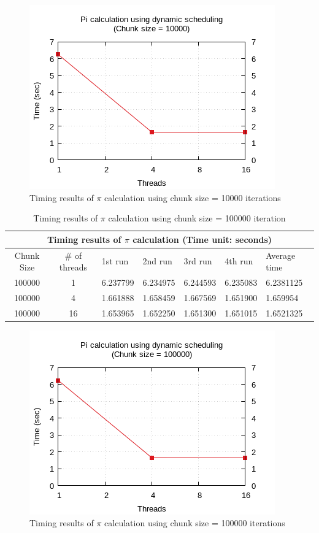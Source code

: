 \documentclass{article}
\begin{document}
\begin{figure}[htbp]
  \centering
  \includegraphics[width=0.55\columnwidth]{../ex1/plots/pi_c10000.png}
  \caption{Timing results of $\pi$ calculation using chunk size = 10000 iterations}
\end{figure}



\begin{table}[htbp]
  \centering
    \begin{tabular}{|c c||l l l l| l|} 
    \hline
    \multicolumn{7}{|c|}{Timing results of $\pi$ calculation (Time unit: seconds)} \\
    \hline
    Chunk Size & \# of threads & 1st run & 2nd run & 3rd run & 4th run & Average time\\ [0.5ex] 
    \hline\hline
    100000 & 1 & 6.237799 & 6.234975 & 6.244593 & 6.235083 & 6.2381125 \\
    \hline
    100000 & 4 & 1.661888 & 1.658459 & 1.667569 & 1.651900 & 1.659954 \\
    \hline
    100000 & 16 & 1.653965 & 1.652250 & 1.651300 & 1.651015 & 1.6521325 \\ [1ex]
    \hline
    \end{tabular}
  \caption{Timing results of $\pi$ calculation using chunk size = 100000 iteration}
\end{table}

\begin{figure}[htbp]
  \centering
  \includegraphics[width=0.55\columnwidth]{../ex1/plots/pi_c100000.png}
  \caption{Timing results of $\pi$ calculation using chunk size = 100000 iterations}
\end{figure}
\end{document}
